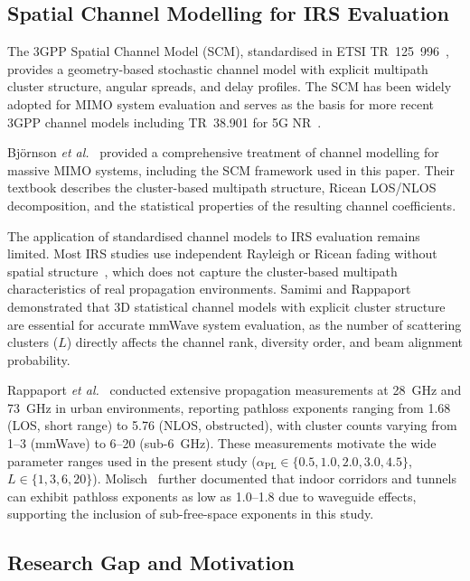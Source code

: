 \documentclass[journal]{IEEEtran} %
\begin{document}
\subsection{Spatial Channel Modelling for IRS Evaluation}

The 3GPP Spatial Channel Model (SCM), standardised in ETSI TR~125~996~\cite{etsi125996}, provides a geometry-based stochastic channel model with explicit multipath cluster structure, angular spreads, and delay profiles. The SCM has been widely adopted for MIMO system evaluation and serves as the basis for more recent 3GPP channel models including TR~38.901 for 5G NR~\cite{3gpp38901}.

Bj\"{o}rnson \textit{et al.}~\cite{bjornson2024mimobook} provided a comprehensive treatment of channel modelling for massive MIMO systems, including the SCM framework used in this paper. Their textbook describes the cluster-based multipath structure, Ricean LOS/NLOS decomposition, and the statistical properties of the resulting channel coefficients.

The application of standardised channel models to IRS evaluation remains limited. Most IRS studies use independent Rayleigh or Ricean fading without spatial structure~\cite{wu2020irs_tutorial,basar2019wireless}, which does not capture the cluster-based multipath characteristics of real propagation environments. Samimi and Rappaport~\cite{samimi2016mmwave_scm} demonstrated that 3D statistical channel models with explicit cluster structure are essential for accurate mmWave system evaluation, as the number of scattering clusters ($L$) directly affects the channel rank, diversity order, and beam alignment probability.

Rappaport \textit{et al.}~\cite{rappaport2015mmwave} conducted extensive propagation measurements at 28~GHz and 73~GHz in urban environments, reporting pathloss exponents ranging from 1.68 (LOS, short range) to 5.76 (NLOS, obstructed), with cluster counts varying from 1--3 (mmWave) to 6--20 (sub-6~GHz). These measurements motivate the wide parameter ranges used in the present study ($\alpha_{\mathrm{PL}} \in \{0.5, 1.0, 2.0, 3.0, 4.5\}$, $L \in \{1, 3, 6, 20\}$). Molisch~\cite{molisch2006channel} further documented that indoor corridors and tunnels can exhibit pathloss exponents as low as 1.0--1.8 due to waveguide effects, supporting the inclusion of sub-free-space exponents in this study.

\subsection{Research Gap and Motivation}
\end{document}
